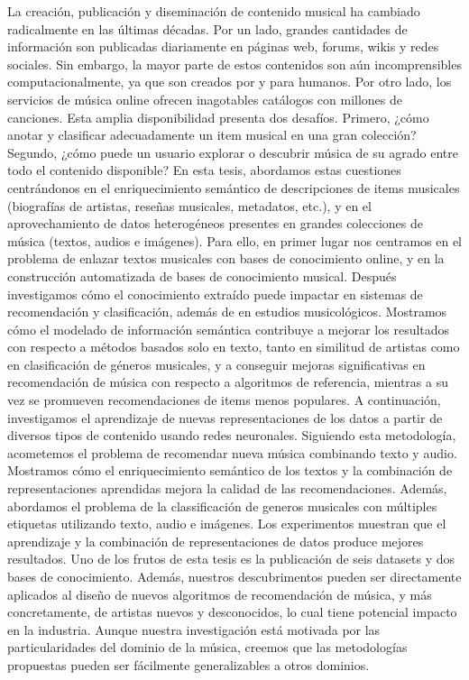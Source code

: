 La creación, publicación y diseminación de contenido musical ha cambiado radicalmente en las últimas décadas. Por un lado, grandes cantidades de información son publicadas diariamente en páginas web, forums, wikis y redes sociales. Sin embargo, la mayor parte de estos contenidos son aún incomprensibles computacionalmente, ya que son creados por y para humanos. Por otro lado, los servicios de música online ofrecen inagotables catálogos con millones de canciones. Esta amplia disponibilidad presenta dos desafíos. Primero, ¿cómo anotar y clasificar adecuadamente un item musical en una gran colección? Segundo, ¿cómo puede un usuario explorar o descubrir música de su agrado entre todo el contenido disponible? En esta tesis, abordamos estas cuestiones centrándonos en el enriquecimiento semántico de descripciones de items musicales (biografías de artistas, reseñas musicales, metadatos, etc.), y en el aprovechamiento de datos heterogéneos presentes en grandes colecciones de música (textos, audios e imágenes). Para ello, en primer lugar nos centramos en el problema de enlazar textos musicales con bases de conocimiento online, y en la construcción automatizada de bases de conocimiento musical. Después investigamos cómo el conocimiento extraído puede impactar en sistemas de recomendación y clasificación, además de en estudios musicológicos. Mostramos cómo el modelado de información semántica contribuye a mejorar los resultados con respecto a métodos basados solo en texto, tanto en similitud de artistas como en clasificación de géneros musicales, y a conseguir mejoras significativas en recomendación de música con respecto a algoritmos de referencia, mientras a su vez se promueven recomendaciones de items menos populares. A continuación, investigamos el aprendizaje de nuevas representaciones de los datos a partir de diversos tipos de contenido usando redes neuronales. Siguiendo esta metodología, acometemos el problema de recomendar nueva música combinando texto y audio. Mostramos cómo el enriquecimiento semántico de los textos y la combinación de representaciones aprendidas mejora la calidad de las recomendaciones. Además, abordamos el problema de la classificación de generos musicales con múltiples etiquetas utilizando texto, audio e imágenes. Los experimentos muestran que el aprendizaje y la combinación de representaciones de datos produce mejores resultados. Uno de los frutos de esta tesis es la publicación de seis datasets y dos bases de conocimiento. Además, nuestros descubrimentos pueden ser directamente aplicados al diseño de nuevos algoritmos de recomendación de música, y más concretamente, de artistas nuevos y desconocidos, lo cual tiene potencial impacto en la industria. Aunque nuestra investigación está motivada por las particularidades del dominio de la música, creemos que las metodologías propuestas pueden ser fácilmente generalizables a otros dominios.